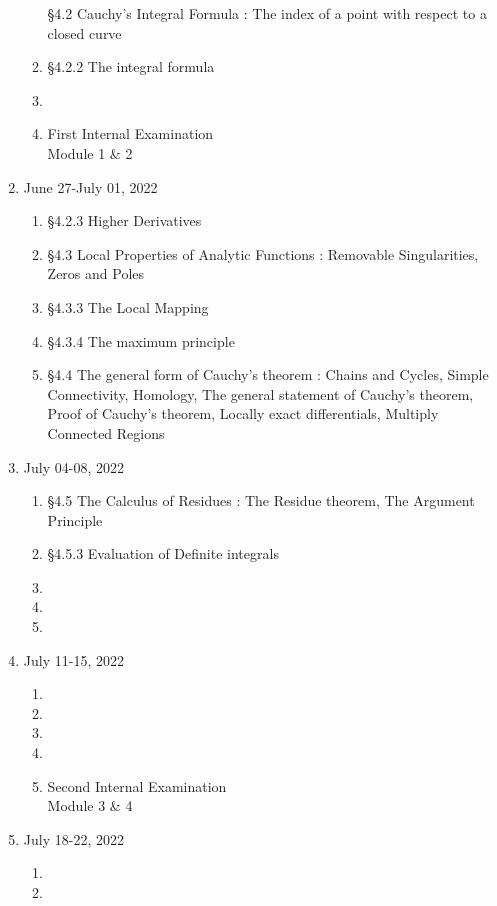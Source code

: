 \begin{enumerate}[label=Week \arabic*]
\begin{enumerate}[label=Day \arabic*]
			\S4.2 Cauchy's Integral Formula : The index of a point with respect to a closed curve
		\item 
			\S4.2.2 The integral formula
		\item 
		\item 
			First Internal Examination \\
			Module 1 \& 2
	\end{enumerate}
	\item June 27-July 01, 2022 
	\begin{enumerate}[label=Day \arabic*]
		\item 
			\S4.2.3 Higher Derivatives
		\item 
			\S4.3 Local Properties of Analytic Functions : Removable Singularities, Zeros and Poles
		\item 
			\S4.3.3 The Local Mapping
		\item 
			\S4.3.4 The maximum principle
		\item 
			\S4.4 The general form of Cauchy's theorem : Chains and Cycles, Simple Connectivity, Homology, The general statement of Cauchy's theorem, Proof of Cauchy's theorem, Locally exact differentials, Multiply Connected Regions
	\end{enumerate}
	\item July 04-08, 2022 
	\begin{enumerate}[label=Day \arabic*]
		\item 
			\S4.5 The Calculus of Residues : The Residue theorem, The Argument Principle
		\item  
			\S4.5.3 Evaluation of Definite integrals
		\item 
		\item 
		\item 
	\end{enumerate}
	\item July 11-15, 2022 
	\begin{enumerate}[label=Day \arabic*]
		\item 
		\item 
		\item 
		\item 
		\item 
			Second Internal Examination \\
			Module 3 \& 4
	\end{enumerate}
	\item July 18-22, 2022 
	\begin{enumerate}[label=Day \arabic*]
		\item 
		\item 

\end{enumerate}
\end{enumerate}

